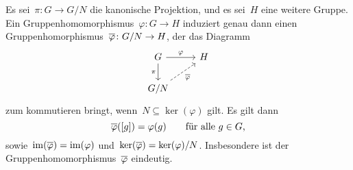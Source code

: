 \begin{theorem}[Homomorphiesatz]
  Es sei~$\pi \colon G \to G/N$ die kanonische Projektion, und es sei~$H$ eine weitere Gruppe.
  Ein Gruppenhomomorphismus~$\varphi \colon G \to H$ induziert genau dann einen Gruppenhomorphismus~$\induced{\varphi} \colon G/N \to H$, der das Diagramm
  \[
    \begin{tikzcd}
      G
      \arrow{r}[above]{\varphi}
      \arrow{d}[left]{\pi}
      &
      H
      \\
      G/N
      \arrow[dashed]{ur}[below right]{\induced{\varphi}}
      &
      {}
    \end{tikzcd}
  \]
  zum kommutieren bringt, wenn~$N \subseteq \ker(\varphi)$ gilt.
  Es gilt dann
  \[
    \overline{\varphi}( [g] )
    =
    \varphi(g)
    \qquad
    \text{für alle~$g \in G$,}
  \]
  sowie~$\operatorname{im}(\overline{\varphi}) = \operatorname{im}(\varphi)$ und~$\ker(\overline{\varphi}) = \ker(\varphi)/N$.
  Insbesondere ist der Gruppenhomomorphismus~$\overline{\varphi}$ eindeutig.

\end{theorem}
